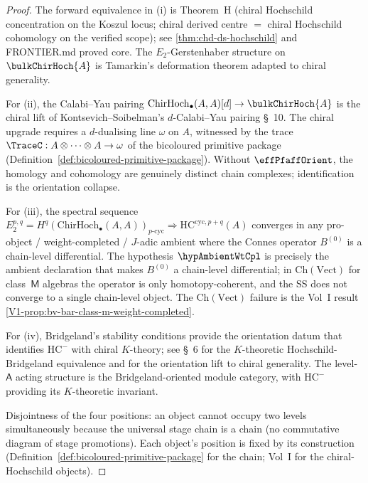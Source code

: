 \begin{proof}
The forward equivalence in (i) is Theorem~H (chiral Hochschild
concentration on the Koszul locus; chiral derived centre $=$
chiral Hochschild cohomology on the verified scope); see
\cref{thm:chd-ds-hochschild} and FRONTIER.md proved core. The
$E_2$-Gerstenhaber structure on $\bulkChirHoch{A}$ is Tamarkin's
deformation theorem \cite{Tamarkin2003} adapted to chiral
generality.

For (ii), the Calabi--Yau pairing
$\mathrm{ChirHoch}_{\bullet}(A, A)[d] \to \bulkChirHoch{A}$ is the
chiral lift of Kontsevich--Soibelman's $d$-Calabi--Yau pairing
\cite{KS09} \S~10. The chiral upgrade requires a $d$-dualising line
$\omega$ on $A$, witnessed by the trace
$\TraceC: A \otimes \cdots \otimes A \to \omega$
of the bicoloured primitive package
(Definition~\ref{def:bicoloured-primitive-package}). Without
$\effPfaffOrient$, the homology and cohomology are genuinely
distinct chain complexes; identification is the orientation
collapse.

For (iii), the spectral sequence
$E^{p, q}_2 = H^q(\mathrm{ChirHoch}_{\bullet}(A, A))_{p\text{-cyc}}
 \Rightarrow \mathrm{HC}^{\mathrm{cyc}, p+q}(A)$
converges in any pro-object / weight-completed / $J$-adic
ambient where the Connes operator $B^{(0)}$ is a chain-level
differential. The hypothesis $\hypAmbientWtCpl$ is precisely
the ambient declaration that makes $B^{(0)}$ a chain-level
differential; in $\mathrm{Ch}(\mathrm{Vect})$ for class~$\mathsf{M}$
algebras the operator is only homotopy-coherent, and the SS
does not converge to a single chain-level object. The
$\mathrm{Ch}(\mathrm{Vect})$ failure is the Vol~I result
\cref{V1-prop:bv-bar-class-m-weight-completed}.

For (iv), Bridgeland's stability conditions
\cite{Bridgeland07,BM01} provide the orientation datum that
identifies $\mathrm{HC}^{-}$ with chiral $K$-theory; see
\cite{BZN12} \S~6 for the $K$-theoretic Hochschild-Bridgeland
equivalence and \cite{HKKP11} for the orientation lift to chiral
generality. The level-$\mathsf{A}$ acting structure is the
Bridgeland-oriented module category, with $\mathrm{HC}^{-}$
providing its $K$-theoretic invariant.

Disjointness of the four positions: an object cannot occupy two
levels simultaneously because the universal stage chain is a
chain (no commutative diagram of stage promotions). Each object's
position is fixed by its construction
(Definition~\ref{def:bicoloured-primitive-package} for the chain;
Vol~I \cite{LQ84,Con85} for the chiral-Hochschild objects).
\end{proof}

